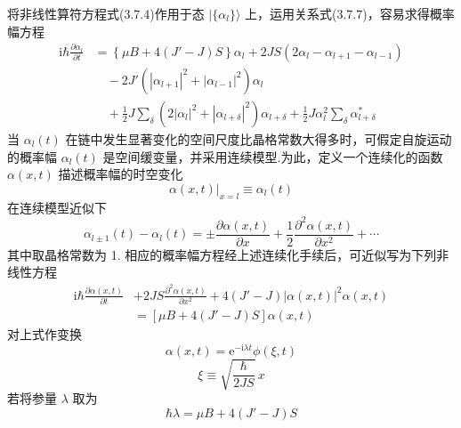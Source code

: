将非线性算符方程式(3.7.4)作用于态 $|\{\alpha_l\}\rangle$
上，运用关系式(3.7.7)，容易求得概率幅方程
\begin{equation}
\begin{aligned}
  \mathrm{i}\hbar\frac{\partial\alpha_l}{\partial t}
  &=\left\{\mu B+4\left(J'-J\right)S\right\}\alpha_l
  +2JS\left(2\alpha_l-\alpha_{l+1}-\alpha_{l-1}\right)\\
  &\quad-2J'\left(\left|\alpha_{l+1}\right|^2+\left|\alpha_{l-1}\right|^2\right)\alpha_l\\
  &\quad+\frac{1}{2}J\sum_\delta\left(2\left|\alpha_l\right|^2
  +\left|\alpha_{l+\delta}\right|^2\right)\alpha_{l+\delta}
  +\frac{1}{2}J\alpha_l^2\sum_\delta\alpha_{l+\delta}^{*}
\end{aligned}
\end{equation}
当 $\alpha_l\left(t\right)$
在链中发生显著变化的空间尺度比晶格常数大得多时，可假定自旋运动的概率幅
$\alpha_l\left(t\right)$
是空间缓变量，并采用连续模型.为此，定义一个连续化的函数
$\alpha\left(x,t\right)$ 描述概率幅的时空变化
\begin{equation}
  \alpha\left(x,t\right)|_{x=l}\equiv\alpha_l\left(t\right)
\end{equation}
在连续模型近似下
\begin{equation}
  \alpha_{l\pm1}\left(t\right)-\alpha_l\left(t\right)=\pm\frac{\partial\alpha\left(x,t\right)}{\partial x}
  +\frac{1}{2}\frac{\partial^2\alpha\left(x,t\right)}{\partial x^2}+\cdots
\end{equation}
其中取晶格常数为 1.
相应的概率幅方程经上述连续化手续后，可近似写为下列非线性方程
\begin{equation}
\begin{aligned}
  \mathrm{i}\hbar\frac{\partial\alpha\left(x,t\right)}{\partial t}
  &+2JS\frac{\partial^2\alpha\left(x,t\right)}{\partial x^2}
  +4\left(J'-J\right)\left|\alpha\left(x,t\right)\right|^2\alpha\left(x,t\right)\\
  &=\left[\mu B+4\left(J'-J\right)S\right]\alpha\left(x,t\right)
\end{aligned}
\end{equation}
对上式作变换
\begin{equation*}
  \alpha\left(x,t\right)=\mathrm{e}^{-\mathrm{i}\lambda t}\phi\left(\xi,t\right)
\end{equation*}
\begin{equation}
  \xi\equiv\sqrt{\frac{\hbar}{2JS}}\,x
\end{equation}
若将参量 $\lambda$ 取为
\begin{equation}
  \hbar\lambda=\mu B+4\left(J'-J\right)S
\end{equation}
